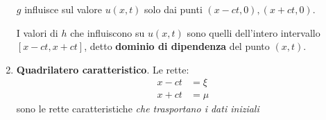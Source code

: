 \begin{enumerate}
          $g$ influisce sul valore $\displaystyle u(x,t)$ solo dai punti $\displaystyle (x-ct,0) ,(x+ct,0)$.

          I valori di $h$ che influiscono su $\displaystyle u(x,t)$ sono quelli dell'intero intervallo $\displaystyle [ x-ct,x+ct]$, detto \textbf{dominio di dipendenza }del punto $\displaystyle (x,t)$.
    \item \textbf{Quadrilatero caratteristico}. Le rette:
          \begin{align*}
              x-ct & =\xi \\
              x+ct & =\mu
          \end{align*}
          sono le rette caratteristiche \emph{che trasportano i dati iniziali}
          \begin{figure}[htpb]
              \centering


              \begin{tikzpicture}[x=0.75pt,y=0.75pt,yscale=-1,xscale=1]


\end{tikzpicture}
\end{figure}
\end{enumerate}
